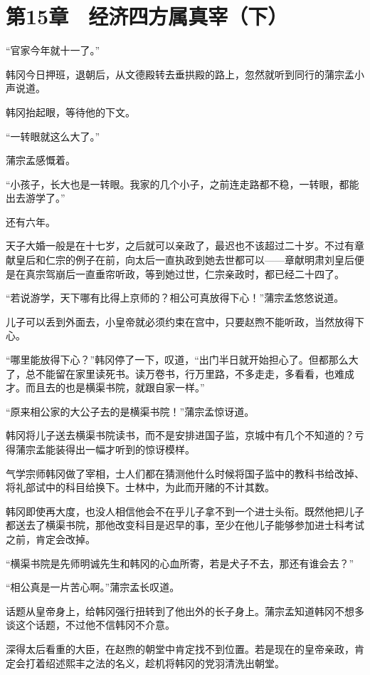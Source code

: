 \section{第15章　经济四方属真宰（下）}

“官家今年就十一了。”

韩冈今日押班，退朝后，从文德殿转去垂拱殿的路上，忽然就听到同行的蒲宗孟小声说道。

韩冈抬起眼，等待他的下文。

“一转眼就这么大了。”

蒲宗孟感慨着。

“小孩子，长大也是一转眼。我家的几个小子，之前连走路都不稳，一转眼，都能出去游学了。”

还有六年。

天子大婚一般是在十七岁，之后就可以亲政了，最迟也不该超过二十岁。不过有章献皇后和仁宗的例子在前，向太后一直执政到她去世都可以——章献明肃刘皇后便是在真宗驾崩后一直垂帘听政，等到她过世，仁宗亲政时，都已经二十四了。

“若说游学，天下哪有比得上京师的？相公可真放得下心！”蒲宗孟悠悠说道。

儿子可以丢到外面去，小皇帝就必须约束在宫中，只要赵煦不能听政，当然放得下心。

“哪里能放得下心？”韩冈停了一下，叹道，“出门半日就开始担心了。但都那么大了，总不能留在家里读死书。读万卷书，行万里路，不多走走，多看看，也难成才。而且去的也是横渠书院，就跟自家一样。”

“原来相公家的大公子去的是横渠书院！”蒲宗孟惊讶道。

韩冈将儿子送去横渠书院读书，而不是安排进国子监，京城中有几个不知道的？亏得蒲宗孟能装得出一幅才听到的惊讶模样。

气学宗师韩冈做了宰相，士人们都在猜测他什么时候将国子监中的教科书给改掉、将礼部试中的科目给换下。士林中，为此而开赌的不计其数。

韩冈即使再大度，也没人相信他会不在乎儿子拿不到一个进士头衔。既然他把儿子都送去了横渠书院，那他改变科目是迟早的事，至少在他儿子能够参加进士科考试之前，肯定会改掉。

“横渠书院是先师明诚先生和韩冈的心血所寄，若是犬子不去，那还有谁会去？”

“相公真是一片苦心啊。”蒲宗孟长叹道。

话题从皇帝身上，给韩冈强行扭转到了他出外的长子身上。蒲宗孟知道韩冈不想多谈这个话题，不过他不信韩冈不介意。

深得太后看重的大臣，在赵煦的朝堂中肯定找不到位置。若是现在的皇帝亲政，肯定会打着绍述熙丰之法的名义，趁机将韩冈的党羽清洗出朝堂。

